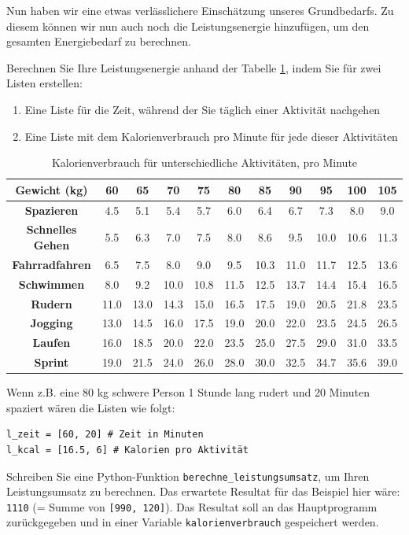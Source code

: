 Nun haben wir eine etwas verlässlichere Einschätzung unseres Grundbedarfs. Zu diesem können wir nun auch noch die Leistungsenergie hinzufügen, um den gesamten Energiebedarf zu berechnen.

\begin{mysubmission}\label{ex:leistungsumsatz}
Berechnen Sie Ihre Leistungsenergie anhand der Tabelle \ref{tab:kcal}, indem Sie für zwei Listen erstellen: 
\begin{enumerate}
\item Eine Liste für die Zeit, während der Sie täglich einer Aktivität nachgehen
\item Eine Liste mit dem Kalorienverbrauch pro Minute für jede dieser Aktivitäten
\end{enumerate} 

\begin{table}[H]
\centering
\begin{tabular}{c|*{10}{c}}
\textbf{Gewicht (kg)} & 60 & 65 & 70 & 75 & 80 & 85 & 90 & 95 & 100 & 105 \\
\midrule\midrule
\textbf{Spazieren} & 4.5 & 5.1 & 5.4 & 5.7 & 6.0 & 6.4 & 6.7 & 7.3 & 8.0 & 9.0 \\
\midrule
\textbf{Schnelles Gehen} & 5.5 & 6.3 & 7.0 & 7.5 & 8.0 & 8.6 & 9.5 & 10.0 & 10.6 & 11.3 \\
\midrule
\textbf{Fahrradfahren} & 6.5 & 7.5 & 8.0 & 9.0 & 9.5 & 10.3 & 11.0 & 11.7 & 12.5 & 13.6 \\
\midrule
\textbf{Schwimmen} & 8.0 & 9.2 & 10.0 & 10.8 & 11.5 & 12.5 & 13.7 & 14.4 & 15.4 & 16.5 \\
\midrule
\textbf{Rudern} & 11.0 & 13.0 & 14.3 & 15.0 & 16.5 & 17.5 & 19.0 & 20.5 & 21.8 & 23.5 \\
\midrule
\textbf{Jogging} & 13.0 & 14.5 & 16.0 & 17.5 & 19.0 & 20.0 & 22.0 & 23.5 & 24.5 & 26.5 \\
\midrule
\textbf{Laufen} & 16.0 & 18.5 & 20.0 & 22.0 & 23.5 & 25.0 & 27.5 & 29.0 & 31.0 & 33.5 \\
\midrule
\textbf{Sprint} & 19.0 & 21.5 & 24.0 & 26.0 & 28.0 & 30.0 & 32.5 & 34.7 & 35.6 & 39.0 \\
\end{tabular}
\caption{Kalorienverbrauch für unterschiedliche Aktivitäten, pro Minute}
\label{tab:kcal}
\end{table}
Wenn z.B. eine 80 kg schwere Person 1 Stunde lang rudert und 20 Minuten spaziert wären die Listen wie folgt:
\begin{lstlisting}
l_zeit = [60, 20] # Zeit in Minuten
l_kcal = [16.5, 6] # Kalorien pro Aktivität
\end{lstlisting}
Schreiben Sie eine Python-Funktion \lstinline|berechne_leistungsumsatz|, um Ihren Leistungsumsatz zu berechnen. Das erwartete Resultat für das Beispiel hier wäre: \lstinline|1110| (= Summe von \lstinline|[990, 120]|). Das Resultat soll an das Hauptprogramm zurückgegeben und in einer Variable \texttt{kalorienverbrauch} gespeichert werden.
\begin{myanswer}

\end{myanswer}

\end{mysubmission}

